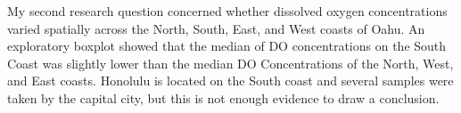 \documentclass[12pt,]{article}
\begin{document}
My second research question concerned whether dissolved oxygen
concentrations varied spatially across the North, South, East, and West
coasts of Oahu. An exploratory boxplot showed that the median of DO
concentrations on the South Coast was slightly lower than the median DO
Concentrations of the North, West, and East coasts. Honolulu is located
on the South coast and several samples were taken by the capital city,
but this is not enough evidence to draw a conclusion.
\end{document}
